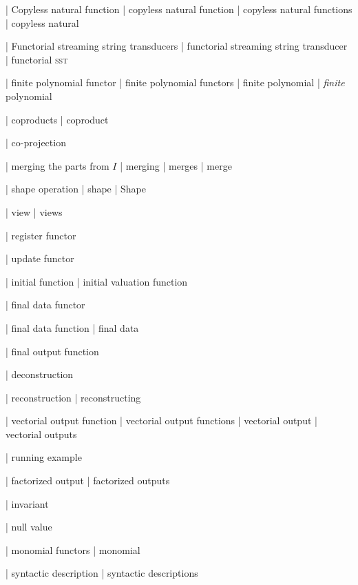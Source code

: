 | Copyless natural function
| copyless natural function
| copyless natural functions
| copyless natural

| Functorial streaming string transducers
| functorial streaming string transducer
| functorial \textsc {sst}

| finite polynomial functor
| finite polynomial functors
| finite polynomial
| \emph {finite} polynomial

| coproducts
| coproduct

| co-projection

| merging the parts from $I$
| merging
| merges
| merge

| shape operation
| shape
| Shape

| view
| views

| register functor

| update functor

| initial function
| initial valuation function

| final data functor

| final data function
| final data

| final output function

| deconstruction

| reconstruction
| reconstructing

| vectorial output function
| vectorial output functions
| vectorial output
| vectorial outputs

| running example

| factorized output
| factorized outputs

| invariant

| null value

 | monomial functors
 | monomial

 | syntactic description
 | syntactic descriptions
